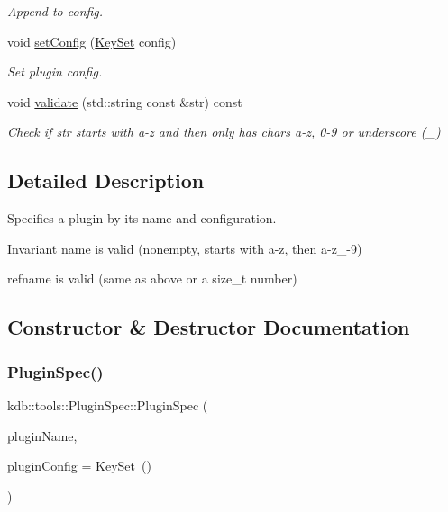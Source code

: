 \begin{DoxyCompactItemize}
\begin{DoxyCompactList}\small\item\em Append to config. \end{DoxyCompactList}\item 
void \mbox{\hyperlink{classkdb_1_1tools_1_1PluginSpec_a37e6cd12d1f059b64569b86f9a3464a1}{set\+Config}} (\mbox{\hyperlink{classkdb_1_1KeySet}{Key\+Set}} config)
\begin{DoxyCompactList}\small\item\em Set plugin config. \end{DoxyCompactList}\item 
void \mbox{\hyperlink{classkdb_1_1tools_1_1PluginSpec_a26c3e9943430571562ad466ac70ce4d6}{validate}} (std\+::string const \&str) const
\begin{DoxyCompactList}\small\item\em Check if str starts with a-\/z and then only has chars a-\/z, 0-\/9 or underscore (\+\_\+) \end{DoxyCompactList}\end{DoxyCompactItemize}


\subsection{Detailed Description}
Specifies a plugin by its name and configuration. 

\begin{DoxyInvariant}{Invariant}
name is valid (nonempty, starts with a-\/z, then a-\/z\+\_-\/9) 

refname is valid (same as above or a size\+\_\+t number) 
\end{DoxyInvariant}


\subsection{Constructor \& Destructor Documentation}
\mbox{\label{classkdb_1_1tools_1_1PluginSpec_a0c327303367f2dbad5ad380dc22bdbee}} 
\subsubsection{\texorpdfstring{PluginSpec()}{PluginSpec()}\hspace{0.1cm}{\footnotesize\ttfamily [1/3]}}
{\footnotesize\ttfamily kdb\+::tools\+::\+Plugin\+Spec\+::\+Plugin\+Spec (\begin{DoxyParamCaption}\item[{std\+::string}]{plugin\+Name,  }\item[{\mbox{\hyperlink{classkdb_1_1KeySet}{Key\+Set}}}]{plugin\+Config = {\ttfamily \mbox{\hyperlink{classkdb_1_1KeySet}{Key\+Set}}~()} }\end{DoxyParamCaption})\hspace{0.3cm}{\ttfamily [explicit]}}




